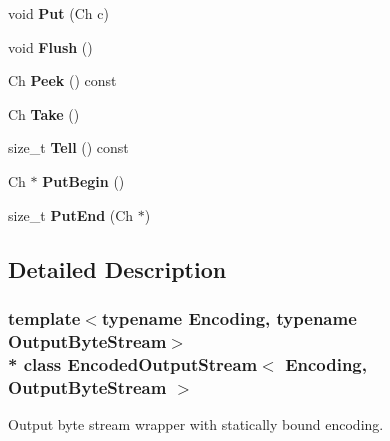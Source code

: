 \begin{DoxyCompactItemize}
\item 
void {\bfseries Put} (Ch c)\hypertarget{class_encoded_output_stream_a0f3c00f94c195a38d78c05ecda497481}{}\label{class_encoded_output_stream_a0f3c00f94c195a38d78c05ecda497481}

\item 
void {\bfseries Flush} ()\hypertarget{class_encoded_output_stream_a657188f6a9f0fae01a4012c288d3fd46}{}\label{class_encoded_output_stream_a657188f6a9f0fae01a4012c288d3fd46}

\item 
Ch {\bfseries Peek} () const \hypertarget{class_encoded_output_stream_aa1dbe6b921fe788f3229024fb5598647}{}\label{class_encoded_output_stream_aa1dbe6b921fe788f3229024fb5598647}

\item 
Ch {\bfseries Take} ()\hypertarget{class_encoded_output_stream_a90f5a5e1598316a417ef5b6ad3d49f36}{}\label{class_encoded_output_stream_a90f5a5e1598316a417ef5b6ad3d49f36}

\item 
size\+\_\+t {\bfseries Tell} () const \hypertarget{class_encoded_output_stream_ab580ac97f1a22c2a6abc4a31bb5c8272}{}\label{class_encoded_output_stream_ab580ac97f1a22c2a6abc4a31bb5c8272}

\item 
Ch $\ast$ {\bfseries Put\+Begin} ()\hypertarget{class_encoded_output_stream_a78934de4f76c9fa65238e65d3630cbc5}{}\label{class_encoded_output_stream_a78934de4f76c9fa65238e65d3630cbc5}

\item 
size\+\_\+t {\bfseries Put\+End} (Ch $\ast$)\hypertarget{class_encoded_output_stream_a818695f6d3fa8896e9d7d0fbdc7d4514}{}\label{class_encoded_output_stream_a818695f6d3fa8896e9d7d0fbdc7d4514}

\end{DoxyCompactItemize}


\subsection{Detailed Description}
\subsubsection*{template$<$typename Encoding, typename Output\+Byte\+Stream$>$\\*
class Encoded\+Output\+Stream$<$ Encoding, Output\+Byte\+Stream $>$}

Output byte stream wrapper with statically bound encoding. 



